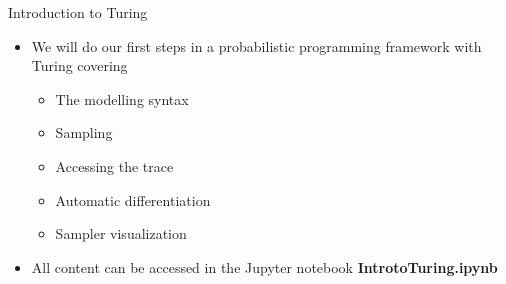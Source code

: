 \documentclass[AERbeamer%
              ,optEnglish%
              ,optBiber%
              ,optBibstyleAlphabetic%
              ,optBeamerClassicFormat%
              ]{AERlatex}%
\begin{document}
\begin{frame}[c]{Introduction to Turing}
    \centering
    \begin{itemize}
        \item We will do our first steps in a probabilistic programming framework with Turing covering
        \begin{itemize}
            \item The modelling syntax
            \item Sampling
            \item Accessing the trace
            \item Automatic differentiation
            \item Sampler visualization
        \end{itemize}
        \item All content can be accessed in the Jupyter notebook \textbf{IntrotoTuring.ipynb}
    \end{itemize}
\end{frame}










%
%
%
%
\end{document}
